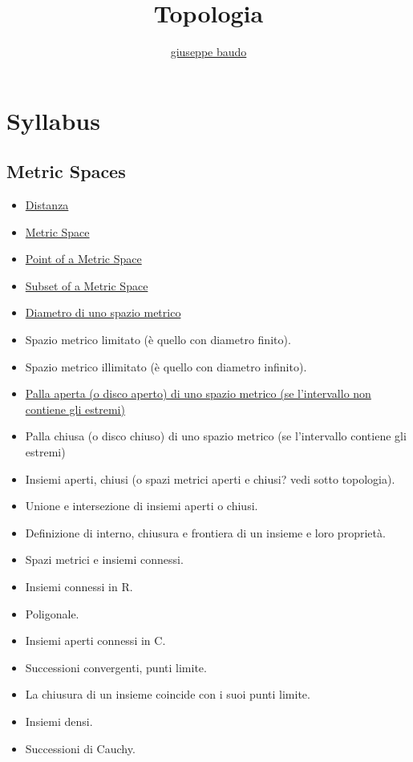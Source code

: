 \documentclass[a4paper,10pt]{article}
\title{Topologia}
\author{\href{http://www.baudo.hol.es}{giuseppe baudo}}
\begin{document}
\maketitle

\section*{Syllabus}
\subsection*{Metric Spaces}
  \begin{itemize}
    \item \href{Distanza.html}{Distanza}
    \item \href{MetricSpace.html}{Metric Space}
    \item \href{PointMetricSpace.html}{Point of a Metric Space}
    \item \href{SubsetMetricSpace.html}{Subset of a Metric Space}
    \item \href{DiametroSpazioMetrico.html}{Diametro di uno spazio metrico} 
    \item Spazio metrico limitato (è quello con diametro finito).
    \item Spazio metrico illimitato (è quello con diametro infinito). 
    \item \href{PallaAperta.html}{Palla aperta (o disco aperto) di uno spazio metrico (se l'intervallo non contiene gli estremi)}
    \item Palla chiusa (o disco chiuso) di uno spazio metrico (se l'intervallo contiene gli estremi)
    \item Insiemi aperti, chiusi (o spazi metrici aperti e chiusi? vedi sotto topologia). 
    \item Unione e intersezione di insiemi aperti o chiusi. 
    \item Definizione di interno, chiusura e frontiera di un insieme e loro proprietà. 
    \item Spazi metrici e insiemi connessi. 
    \item Insiemi connessi in R. 
    \item Poligonale.
    \item Insiemi aperti connessi in C. 
    \item Successioni convergenti, punti limite. 
    \item La chiusura di un insieme coincide con i suoi punti limite. 
    \item Insiemi densi. 
    \item Successioni di Cauchy.

\end{itemize}
\end{document}
